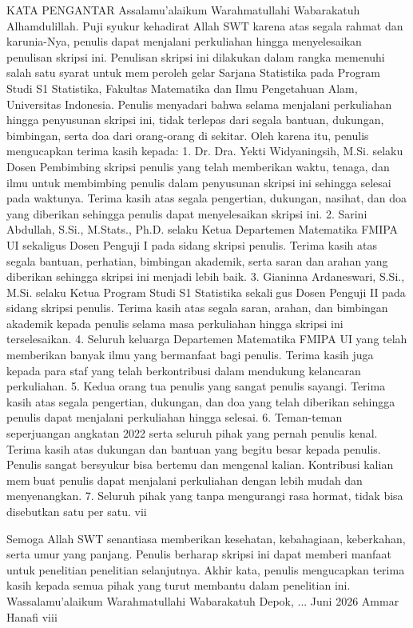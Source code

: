KATA PENGANTAR
Assalamu’alaikum Warahmatullahi Wabarakatuh
Alhamdulillah. Puji syukur kehadirat Allah SWT karena atas segala rahmat dan
karunia-Nya, penulis dapat menjalani perkuliahan hingga menyelesaikan penulisan skripsi
ini. Penulisan skripsi ini dilakukan dalam rangka memenuhi salah satu syarat untuk memperoleh gelar Sarjana Statistika pada Program Studi S1 Statistika, Fakultas Matematika
dan Ilmu Pengetahuan Alam, Universitas Indonesia. Penulis menyadari bahwa selama
menjalani perkuliahan hingga penyusunan skripsi ini, tidak terlepas dari segala bantuan,
dukungan, bimbingan, serta doa dari orang-orang di sekitar. Oleh karena itu, penulis
mengucapkan terima kasih kepada:
1. Dr. Dra. Yekti Widyaningsih, M.Si. selaku Dosen Pembimbing skripsi penulis
yang telah memberikan waktu, tenaga, dan ilmu untuk membimbing penulis dalam
penyusunan skripsi ini sehingga selesai pada waktunya. Terima kasih atas segala
pengertian, dukungan, nasihat, dan doa yang diberikan sehingga penulis dapat
menyelesaikan skripsi ini.
2. Sarini Abdullah, S.Si., M.Stats., Ph.D. selaku Ketua Departemen Matematika FMIPA
UI sekaligus Dosen Penguji I pada sidang skripsi penulis. Terima kasih atas segala
bantuan, perhatian, bimbingan akademik, serta saran dan arahan yang diberikan
sehingga skripsi ini menjadi lebih baik.
3. Gianinna Ardaneswari, S.Si., M.Si. selaku Ketua Program Studi S1 Statistika sekaligus Dosen Penguji II pada sidang skripsi penulis. Terima kasih atas segala saran,
arahan, dan bimbingan akademik kepada penulis selama masa perkuliahan hingga
skripsi ini terselesaikan.
4. Seluruh keluarga Departemen Matematika FMIPA UI yang telah memberikan banyak
ilmu yang bermanfaat bagi penulis. Terima kasih juga kepada para staf yang telah
berkontribusi dalam mendukung kelancaran perkuliahan.
5. Kedua orang tua penulis yang sangat penulis sayangi. Terima kasih atas segala
pengertian, dukungan, dan doa yang telah diberikan sehingga penulis dapat menjalani
perkuliahan hingga selesai.
6. Teman-teman seperjuangan angkatan 2022 serta seluruh pihak yang pernah penulis
kenal. Terima kasih atas dukungan dan bantuan yang begitu besar kepada penulis.
Penulis sangat bersyukur bisa bertemu dan mengenal kalian. Kontribusi kalian membuat penulis dapat menjalani perkuliahan dengan lebih mudah dan menyenangkan.
7. Seluruh pihak yang tanpa mengurangi rasa hormat, tidak bisa disebutkan satu per
satu.
vii

Semoga Allah SWT senantiasa memberikan kesehatan, kebahagiaan, keberkahan, serta
umur yang panjang. Penulis berharap skripsi ini dapat memberi manfaat untuk penelitianpenelitian selanjutnya. Akhir kata, penulis mengucapkan terima kasih kepada semua pihak
yang turut membantu dalam penelitian ini.
Wassalamu’alaikum Warahmatullahi Wabarakatuh
Depok, ... Juni 2026
Ammar Hanafi
viii


